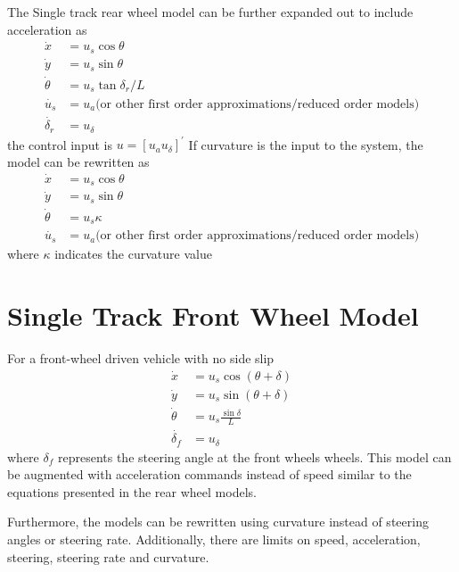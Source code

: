 The Single track rear wheel model can be further expanded out to include acceleration  as
\begin{align}
\dot{x} &= u_s\cos{\theta} \\
\dot{y} & = u_s\sin{\theta} \\
\dot{\theta} & = u_s \tan{\delta_r}/L \\
\dot{u_s} &= u_a \text{(or other first order approximations/reduced order models)} \\
\dot{\delta_r} &= u_\delta
\end{align}
the control input is $u=[u_a  u_\delta]^{'}$
If curvature is the input to the system, the model can be rewritten as
\begin{align}
\dot{x} &= u_s\cos{\theta} \\
\dot{y} & = u_s\sin{\theta} \\
\dot{\theta} & = u_s \kappa \\
\dot{u_s} &= u_a \text{(or other first order approximations/reduced order models)}
\end{align}
where $\kappa$ indicates the curvature value
\section{Single Track Front Wheel Model}
For a front-wheel driven vehicle with no side slip
\begin{align}
\dot{x} &= u_s\cos({\theta + \delta}) \\
\dot{y} & = u_s\sin({\theta + \delta}) \\
\dot{\theta} & = u_s \frac{\sin{\delta}}{L} \\
\dot{\delta_f} &= u_\delta
\end{align}
where $\delta_f$ represents the steering angle at the front wheels wheels.
This model can be augmented with acceleration commands instead of speed similar to the equations presented in the rear wheel models.

Furthermore, the models can be rewritten using curvature instead of steering angles or steering rate. Additionally, there are limits on speed, acceleration, steering, steering rate and curvature.
